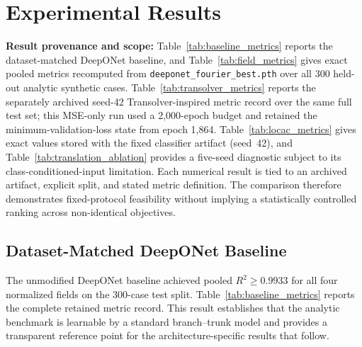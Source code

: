 \documentclass[journal]{IEEEtran}
\newcommand{\added}[1]{#1}
\begin{document}
\section{Experimental Results}
\label{sec:results}

\textbf{Result provenance and scope:} \added{Table~\ref{tab:baseline_metrics} reports the dataset-matched DeepONet baseline, and Table~\ref{tab:field_metrics} gives exact pooled metrics recomputed from \texttt{deeponet\_fourier\_best.pth} over all 300 held-out analytic synthetic cases. Table~\ref{tab:transolver_metrics} reports the separately archived seed-42 Transolver-inspired metric record over the same full test set; this MSE-only run used a 2,000-epoch budget and retained the minimum-validation-loss state from epoch 1,864. Table~\ref{tab:locac_metrics} gives exact values stored with the fixed classifier artifact (seed~42), and Table~\ref{tab:translation_ablation} provides a five-seed diagnostic subject to its class-conditioned-input limitation. Each numerical result is tied to an archived artifact, explicit split, and stated metric definition. The comparison therefore demonstrates fixed-protocol feasibility without implying a statistically controlled ranking across non-identical objectives.}

\subsection{Dataset-Matched DeepONet Baseline}

\added{The unmodified DeepONet baseline achieved pooled $R^2\geq0.9933$ for all four normalized fields on the 300-case test split. Table~\ref{tab:baseline_metrics} reports the complete retained metric record. This result establishes that the analytic benchmark is learnable by a standard branch--trunk model and provides a transparent reference point for the architecture-specific results that follow.}

\begin{table}[htbp]
\caption{Dataset-matched DeepONet pooled test accuracy on 300 held-out analytic synthetic cases}
\label{tab:baseline_metrics}
\centering
{}
\end{table}
\end{document}
